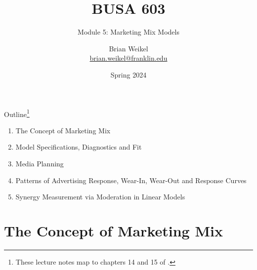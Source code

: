 \documentclass[pdf]{beamer}
\title{BUSA 603}
\subtitle{Module 5:   Marketing Mix Models}
\theoremstyle{remark}
\theoremstyle{definition}
\begin{document}
\author[B. Weikel, Franklin University]{
	\begin{tabular}{c} 
	\Large
	Brian Weikel\\
    \footnotesize \href{mailto:brian.weikel@franklin.edu}{brian.weikel@franklin.edu}
    \vspace{1ex}
\end{tabular}
\vspace{-4ex}}


\date{Spring 2024}%

\begin{noheadline}
\begin{frame}[t]\maketitle\end{frame}
\end{noheadline}

\begin{frame}[t]{Outline\footnote{These lecture notes map to chapters 14 and 15 of \cite{davis2022}.}}
\begin{enumerate}
\item  The Concept of Marketing Mix
\vspace{1.5ex}
\item  Model Specifications, Diagnostics and Fit
\vspace{1.5ex}
\item  Media Planning
\vspace{1.5ex}
\item Patterns of Advertising Response, Wear-In, Wear-Out and Response Curves 
\vspace{1.5ex}
\item Synergy Measurement via Moderation in Linear Models
\end{enumerate}
\end{frame}

\section{The Concept of Marketing Mix}
\end{document}
